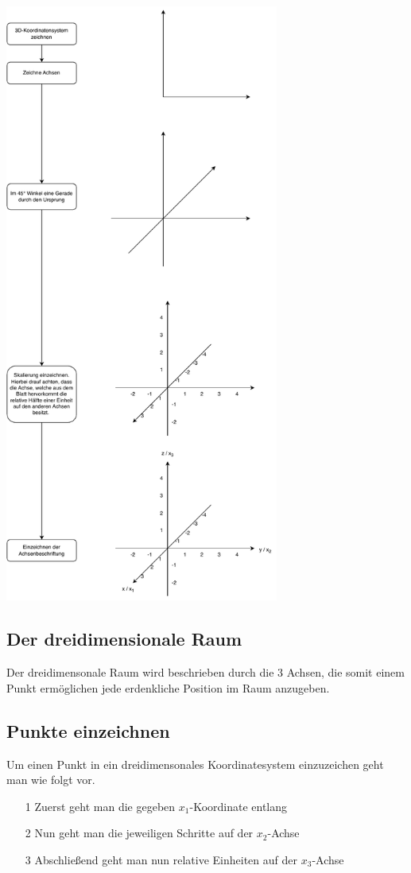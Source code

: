\includegraphics[width=9cm]{Algorithmen/karthesisches-Koordinatensystem-zeichen/karthesisches-Koordinatensystem-zeichen.drawio.pdf}
\subsection{Der dreidimensionale Raum}
Der dreidimensonale Raum wird beschrieben durch die 3 Achsen, die somit einem Punkt ermöglichen jede erdenkliche Position im Raum anzugeben. 


\subsection{Punkte einzeichnen}
Um einen Punkt in ein dreidimensonales Koordinatesystem einzuzeichen geht man wie folgt vor.
\begin{itemize}
	\item[1] Zuerst geht man die gegeben $x_1$-Koordinate entlang
	\item[2] Nun geht man die jeweiligen Schritte auf der $x_2$-Achse
	\item[3] Abschließend geht man nun relative Einheiten auf der $x_3$-Achse  
\end{itemize} 

